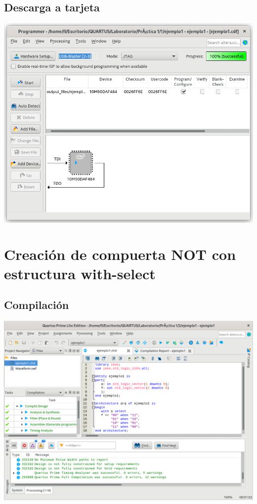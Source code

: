 \documentclass[10pt,a4paper]{article}
\begin{document}
	\subsection{Descarga a tarjeta}
	\begin{center}
		\includegraphics[scale=0.35]{Descarga1.png}
	\end{center}
	
	\section{Creación de compuerta NOT con estructura with-select}
	\subsection{Compilación}
	\begin{center}
		\includegraphics[scale=0.35]{Compilacion.png}
	\end{center}
	
\end{document}
